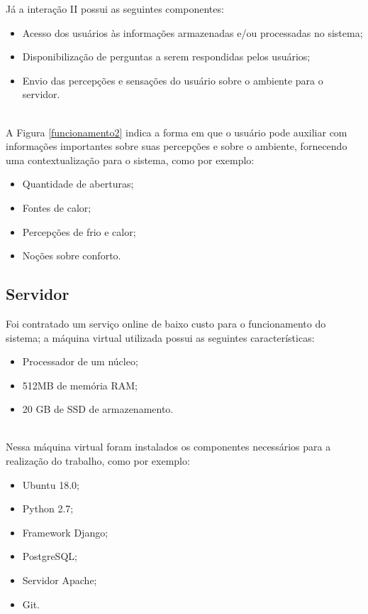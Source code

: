 \null Já a interação II possui as seguintes componentes:
\begin{itemize}
  \item Acesso dos usuários às informações armazenadas e/ou processadas no sistema;
  \item Disponibilização de perguntas a serem respondidas pelos usuários;
  \item Envio das percepções e sensações do usuário sobre o ambiente para o servidor.
\end{itemize}


\\\null \quad A Figura \ref{funcionamento2} indica a forma em que o usuário pode auxiliar com informações importantes sobre suas percepções e sobre o ambiente, fornecendo uma contextualização para o sistema, como por exemplo:
\begin{itemize}
  \item Quantidade de aberturas;
  \item Fontes de calor;
  \item Percepções de frio e calor;
  \item Noções sobre conforto.
\end{itemize}


\subsection{Servidor}
\nul \quad Foi contratado um serviço online de baixo custo para o funcionamento do sistema; a máquina virtual utilizada possui as seguintes características:
\begin{itemize}
  \item Processador de um núcleo;
  \item 512MB de memória RAM;
  \item 20 GB de SSD de armazenamento.
\end{itemize}
\\\null \quad Nessa máquina virtual foram instalados os componentes necessários para a realização do trabalho, como por exemplo:
\begin{itemize}
  \item Ubuntu 18.0;
  \item Python 2.7;
  \item Framework Django;
  \item PostgreSQL;
  \item Servidor Apache;
  \item Git.
\end{itemize}

